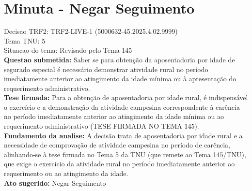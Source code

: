 \documentclass{article}
\begin{document}
\section*{Minuta - Negar Seguimento}
Decisao TRF2: TRF2-LIVE-1 (5000632-45.2025.4.02.9999)\\
Tema TNU: 5\\
Situacao do tema: Revisado pelo Tema 145\\
\textbf{Questao submetida:} Saber se para obtenção da aposentadoria por idade de segurado especial é necessário demonstrar atividade rural no período imediatamente anterior ao atingimento da idade mínima ou à apresentação do requerimento administrativo.\\
\textbf{Tese firmada:} Para a obtenção de aposentadoria por idade rural, é indispensável o exercício e a demonstração da atividade campesina correspondente à carência no período imediatamente anterior ao atingimento da idade mínima ou ao requerimento administrativo (TESE FIRMADA NO TEMA 145).\\
\textbf{Fundamento da analise:} A decisão trata de aposentadoria por idade rural e a necessidade de comprovação de atividade campesina no período de carência, alinhando-se à tese firmada no Tema 5 da TNU (que remete ao Tema 145/TNU), que exige o exercício da atividade rural no período imediatamente anterior ao requerimento ou ao atingimento da idade.\\
\textbf{Ato sugerido:} Negar Seguimento
\end{document}
